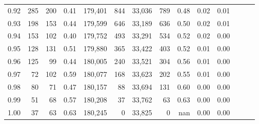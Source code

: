\begin{tabular}{rrrrrrrrrrrrrr}
0.92 &    285 &  200 &  0.41 &  179,401 &      844 &  33,036 &     789 &  0.48 &  0.02 &      0.01 \\
0.93 &    198 &  153 &  0.44 &  179,599 &      646 &  33,189 &     636 &  0.50 &  0.02 &      0.01 \\
0.94 &    153 &  102 &  0.40 &  179,752 &      493 &  33,291 &     534 &  0.52 &  0.02 &      0.00 \\
0.95 &    128 &  131 &  0.51 &  179,880 &      365 &  33,422 &     403 &  0.52 &  0.01 &      0.00 \\
0.96 &    125 &   99 &  0.44 &  180,005 &      240 &  33,521 &     304 &  0.56 &  0.01 &      0.00 \\
0.97 &     72 &  102 &  0.59 &  180,077 &      168 &  33,623 &     202 &  0.55 &  0.01 &      0.00 \\
0.98 &     80 &   71 &  0.47 &  180,157 &       88 &  33,694 &     131 &  0.60 &  0.00 &      0.00 \\
0.99 &     51 &   68 &  0.57 &  180,208 &       37 &  33,762 &      63 &  0.63 &  0.00 &      0.00 \\
1.00 &     37 &   63 &  0.63 &  180,245 &        0 &  33,825 &       0 &   nan &  0.00 &      0.00 \\
\bottomrule
\end{tabular}
